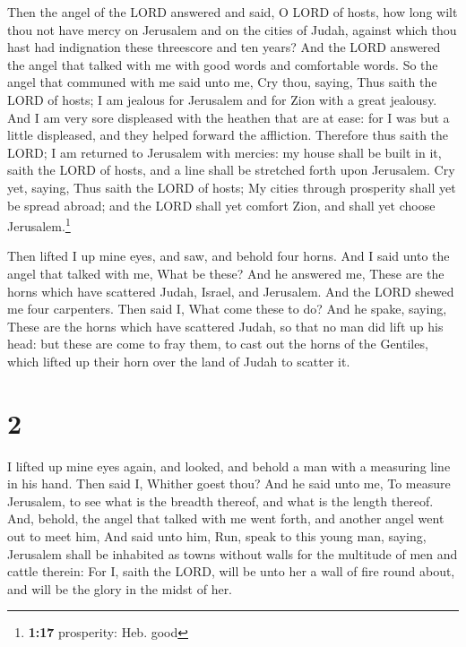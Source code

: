  Then the angel of the LORD answered and said, O LORD of
hosts, how long wilt thou not have mercy on Jerusalem and on the cities
of Judah, against which thou hast had indignation these threescore and
ten years?  And the LORD answered the angel that talked
with me with good words and comfortable words.  So the
angel that communed with me said unto me, Cry thou, saying, Thus saith
the LORD of hosts; I am jealous for Jerusalem and for Zion with a great
jealousy.  And I am very sore displeased with the heathen
that are at ease: for I was but a little displeased, and they helped
forward the affliction.  Therefore thus saith the LORD; I
am returned to Jerusalem with mercies: my house shall be built in it,
saith the LORD of hosts, and a line shall be stretched forth upon
Jerusalem.  Cry yet, saying, Thus saith the LORD of
hosts; My cities through prosperity shall yet be spread abroad; and the
LORD shall yet comfort Zion, and shall yet choose Jerusalem.\footnote{\textbf{1:17}
  prosperity: Heb. good}

 Then lifted I up mine eyes, and saw, and behold four
horns.  And I said unto the angel that talked with me,
What be these? And he answered me, These are the horns which have
scattered Judah, Israel, and Jerusalem.  And the LORD
shewed me four carpenters.  Then said I, What come these
to do? And he spake, saying, These are the horns which have scattered
Judah, so that no man did lift up his head: but these are come to fray
them, to cast out the horns of the Gentiles, which lifted up their horn
over the land of Judah to scatter it.

\hypertarget{section-1}{%
\section{2}\label{section-1}}

 I lifted up mine eyes again, and looked, and behold a man
with a measuring line in his hand.  Then said I, Whither
goest thou? And he said unto me, To measure Jerusalem, to see what is
the breadth thereof, and what is the length thereof.  And,
behold, the angel that talked with me went forth, and another angel went
out to meet him,  And said unto him, Run, speak to this
young man, saying, Jerusalem shall be inhabited as towns without walls
for the multitude of men and cattle therein:  For I, saith
the LORD, will be unto her a wall of fire round about, and will be the
glory in the midst of her.

